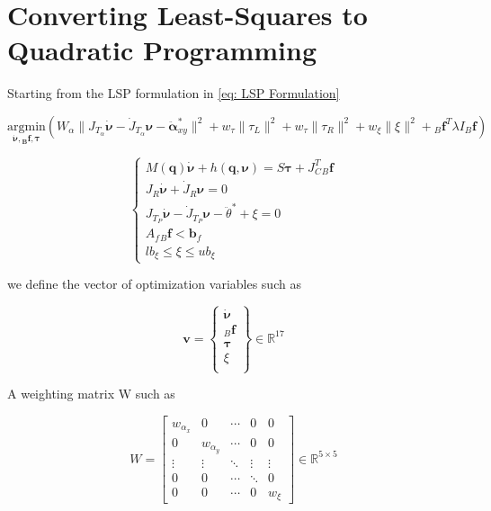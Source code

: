 \section{Converting Least-Squares to Quadratic Programming}
\label{sec:Converting Least-Squares to Quadratic Programming}

Starting from the LSP formulation in \eqref{eq: LSP Formulation}

\begin{center}
$\underset{\bm{\dot{\nu},{}_{B}\mathbf{f},\bm{\tau}}}{\text{argmin}} (W_{\alpha}\|J_{T_{\alpha}}{\dot{\bm{\nu}}} - \dot{J}_{T_{\alpha}}\bm{\nu} - \ddot{\bm{\alpha}}_{xy}^{*}\|^{2} + w_{\tau}\| \tau_L \|^{2} + w_{\tau}\| \tau_R \|^{2} + w_{\xi} \| \xi \|^{2} + {}_{B}\mathbf{f}^{T} \lambda I {}_{B}\mathbf{f})$


\end{center}

\begin{equation*}
\begin{cases}
        M(\mathbf{q})\dot{\bm{\nu}} + h(\mathbf{q},\bm{\nu}) = S\bm{\tau} + J^{T}_{C} {}_{B}\mathbf{f} \\
        J_{R}\bm{\dot{\nu}} + \dot{J}_R\bm{\nu} = 0 \\
        J_{T_P}{\dot{\bm{\nu}}} - \dot{J}_{T_P}\bm{\nu} - \ddot{\theta}^{*} + \xi = 0 \\
        A_{f}{}_{B}\mathbf{f} < \mathbf{b}_{f} \\
        lb_{\xi} \leq \xi \leq ub_{\xi}
\end{cases}
\end{equation*}

we define the vector of optimization variables such as 

\begin{equation}
 \mathbf{v} = \begin{Bmatrix}
     \dot{\bm{\nu}} \\
     {}_{B}\mathbf{f} \\
     \bm{\tau}  \\
     \xi \\
\end{Bmatrix} \in \mathbb{R}^{17}
\end{equation}

A weighting matrix W such as

\begin{equation}
W = \begin{bmatrix}
w_{\alpha_x} & 0 & \cdots & 0 & 0 \\
0 & w_{\alpha_y} & \cdots & 0 & 0 \\
\vdots & \vdots & \ddots & \vdots & \vdots \\
0 & 0 & \cdots &  \ddots & 0 \\
0 & 0 & \cdots & 0 & w_{\xi}
\end{bmatrix} \in \mathbb{R}^{5 \times 5}
\end{equation}


